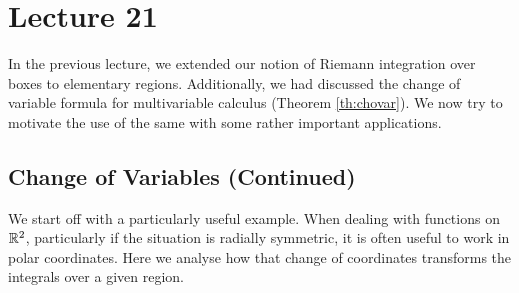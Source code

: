 \documentclass[../Analysis-3.tex]{subfiles}
\begin{document}
\chapter*{Lecture 21} %
\setcounter{chapter}{21} %
\setcounter{section}{0}
\setcounter{equation}{0}
\setcounter{figure}{0}

In the previous lecture, we extended our notion of Riemann integration over boxes to elementary regions. Additionally, we had discussed the change of variable formula for multivariable calculus (Theorem \ref{th:chovar}). We now try to motivate the use of the same with some rather important applications.

\section{Change of Variables (Continued)}

We start off with a particularly useful example. When dealing with functions on $\mathbb{R}^2$, particularly if the situation is radially symmetric, it is often useful to work in polar coordinates. Here we analyse how that change of coordinates transforms the integrals over a given region.
\end{document}
